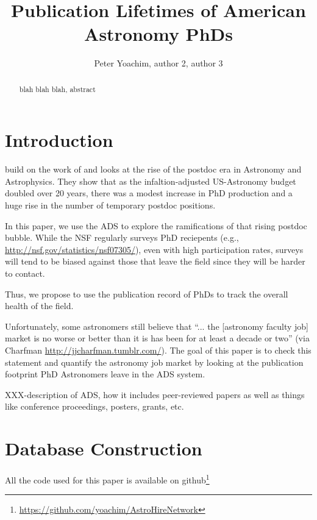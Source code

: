 \documentclass{emulateapj}
\begin{document}
\title{Publication Lifetimes of American Astronomy PhDs}

\author{Peter Yoachim, author 2, author 3 
  }




\begin{abstract}
blah blah blah, abstract

\end{abstract}



\section{Introduction}

\citet{Seth09} build on the work of \citet{Metcalfe08} and looks at the rise of the postdoc era in Astronomy and Astrophysics.  They show that as the infaltion-adjusted US-Astronomy budget doubled over 20 years, there was a modest increase in PhD production and a huge rise in the number of temporary postdoc positions.

In this paper, we use the ADS to explore the ramifications of that rising postdoc bubble.  While the NSF regularly surveys PhD reciepents (e.g., \url{http://nsf.gov/statistics/nsf07305/}), even with high participation rates, surveys will tend to be biased against those that leave the field since they will be harder to contact.

Thus, we propose to use the publication record of PhDs to track the overall health of the field.  

Unfortunately, some astronomers still believe that ``... the [astronomy faculty job] market is no worse or better than it is has been for at least a decade or two'' (via Charfman \url{http://jjcharfman.tumblr.com/}).  The goal of this paper is to check this statement and quantify the astronomy job market by looking at the publication footprint PhD Astronomers leave in the ADS system. 

XXX-description of ADS, how it includes peer-reviewed papers as well as things like conference proceedings, posters, grants, etc.

\section{Database Construction}

All the code used for this paper is available on github\footnote{\url{https://github.com/yoachim/AstroHireNetwork}}
\end{document}
